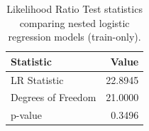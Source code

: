 \begin{table}[H]
\begin{center}
\begin{tabular}{lr}
\toprule
Statistic & Value \\
\midrule
LR Statistic & 22.8945 \\
Degrees of Freedom & 21.0000 \\
p-value & 0.3496 \\
\bottomrule
\end{tabular}
\end{center}
\vspace{-5pt}
\caption{Likelihood Ratio Test statistics comparing nested logistic regression models (train-only).}
\label{tab:lrt_full_vs_reduced}
\end{table}
